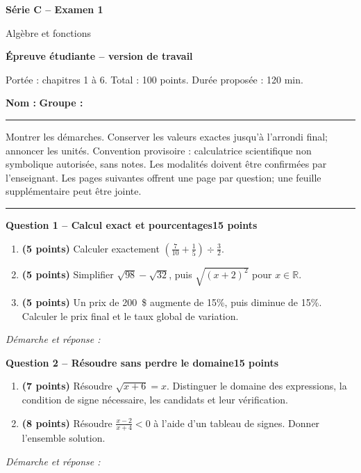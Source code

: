 \documentclass[11pt,a4paper]{article}
\begin{document}
{\LARGE\bfseries Série C -- Examen 1}\par
{\large Algèbre et fonctions}\par
\textbf{Épreuve étudiante -- version de travail}\par
Portée : chapitres 1 à 6. Total : 100 points. Durée proposée : 120 min.\par
\textbf{Nom :} \hrulefill\quad \textbf{Groupe :} \rule{22mm}{0.3pt}\par
\small Montrer les démarches. Conserver les valeurs exactes jusqu’à l’arrondi final; annoncer les unités. Convention provisoire : calculatrice scientifique non symbolique autorisée, sans notes. Les modalités doivent être confirmées par l’enseignant. Les pages suivantes offrent une page par question; une feuille supplémentaire peut être jointe.\normalsize\par
\vspace{3mm}\hrule\vspace{4mm}
{\large\bfseries Question 1 -- Calcul exact et pourcentages}\hfill\textbf{15 points}\par
\begin{enumerate}
\item \textbf{(5 points)} Calculer exactement \(\left(\frac7{10}+\frac15\right)\div\frac32\).
\item \textbf{(5 points)} Simplifier \(\sqrt{98}-\sqrt{32}\), puis \(\sqrt{(x+2)^2}\) pour \(x\in\mathbb R\).
\item \textbf{(5 points)} Un prix de 200~\$ augmente de 15\%, puis diminue de 15\%. Calculer le prix final et le taux global de variation.
\end{enumerate}
\vspace{3mm}\textit{Démarche et réponse :}\par\vfill

\newpage
{\large\bfseries Question 2 -- Résoudre sans perdre le domaine}\hfill\textbf{15 points}\par
\begin{enumerate}
\item \textbf{(7 points)} Résoudre \(\sqrt{x+6}=x\). Distinguer le domaine des expressions, la condition de signe nécessaire, les candidats et leur vérification.
\item \textbf{(8 points)} Résoudre \(\frac{x-2}{x+4}<0\) à l’aide d’un tableau de signes. Donner l’ensemble solution.
\end{enumerate}
\vspace{3mm}\textit{Démarche et réponse :}\par\vfill
\end{document}
